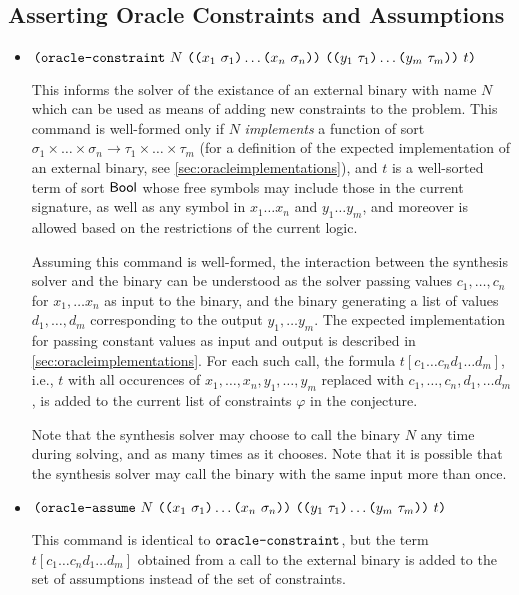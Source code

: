 \documentclass[english,a4paper,10pt]{article}
\begin{document}
\subsection{Asserting Oracle Constraints and Assumptions}
\begin{itemize}
\item $\texttt{(}\texttt{oracle-constraint}\mbox{ } N \mbox{ } 
\texttt{(}\texttt{(}x_1\mbox{ }\sigma_1\texttt{)} \ldots \texttt{(}x_n\mbox{ }\sigma_n\texttt{)}\texttt{)}\mbox{ }
\texttt{(}\texttt{(}y_{1}\mbox{ }\tau_{1}\texttt{)} \ldots \texttt{(}y_{m}\mbox{ }\tau_{m}\texttt{)}\texttt{)}  \mbox{ } t\texttt{)}$

This informs the solver of the existance of an external binary with name $N$
which can be used as means of adding new constraints to the problem.
This command is well-formed only if $N$
\emph{implements} a function of sort $\sigma_1 \times \ldots \times \sigma_n \rightarrow \tau_{1} \times \ldots \times \tau_{m}$
(for a definition of the expected implementation of an external binary, see \cref{sec:oracleimplementations}),
and $t$ is a well-sorted term of sort $\mathsf{Bool}$ 
whose free symbols may include those in the current signature, as well as any symbol in $x_1 \ldots x_{n}$ and $y_1 \ldots y_{m}$,
and moreover is allowed based on the restrictions of the current logic.

Assuming this command is well-formed,
the interaction between the synthesis solver and the binary
can be understood as the solver passing values
$c_1, \ldots, c_n$ for $x_1, \ldots x_n$ as input to the binary,
and the binary generating a list of values
$d_{1}, \ldots, d_{m}$ corresponding to the output $y_{1}, \ldots y_{m}$.
The expected implementation for passing
constant values as input and output 
is described in \cref{sec:oracleimplementations}.
For each such call,
the formula $t[c_1 \ldots c_{n} d_1 \ldots d_m]$, i.e., 
$t$ with all occurences of $x_1, \ldots, x_{n}, y_1, \ldots, y_m$ replaced with $c_1, \ldots, c_{n}, d_1, \ldots d_m$, 
is added to the current list of constraints $\varphi$ in the conjecture.

Note that 
the synthesis solver may choose to call the binary $N$ 
any time during solving, and as many times as it chooses.
Note that it is possible that the synthesis solver may call the binary with
the same input more than once.

\item 
$\texttt{(}\texttt{oracle-assume}\mbox{ } N \mbox{ } 
\texttt{(}\texttt{(}x_1\mbox{ }\sigma_1\texttt{)} \ldots \texttt{(}x_n\mbox{ }\sigma_n\texttt{)}\texttt{)}\mbox{ }
\texttt{(}\texttt{(}y_{1}\mbox{ }\tau_{1}\texttt{)} \ldots \texttt{(}y_{m}\mbox{ }\tau_{m}\texttt{)}\texttt{)}  \mbox{ } t\texttt{)}$

This command is identical to $\texttt{oracle-constraint}$,
but the term $t[c_1 \ldots c_{n} d_1 \ldots d_m]$ obtained from a call to the external binary
is added to the set of assumptions instead of the set of constraints.

\end{itemize}
\end{document}
